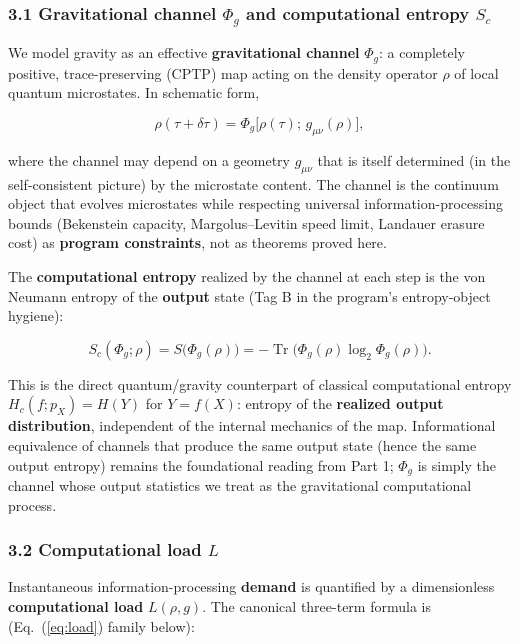 \documentclass[
  11pt,
]{article}
\begin{document}
\subsubsection{\texorpdfstring{3.1 Gravitational channel \(\Phi_g\) and
computational entropy
\(S_c\)}{3.1 Gravitational channel \textbackslash Phi\_g and computational entropy S\_c}}\label{gravitational-channel-phi_g-and-computational-entropy-s_c}

We model gravity as an effective \textbf{gravitational channel}
\(\Phi_g\): a completely positive, trace-preserving (CPTP) map acting on
the density operator \(\rho\) of local quantum microstates. In schematic
form,

\[
\rho(\tau + \delta\tau)
=
\Phi_g\bigl[\rho(\tau);\, g_{\mu\nu}(\rho)\bigr],
\]

where the channel may depend on a geometry \(g_{\mu\nu}\) that is itself
determined (in the self-consistent picture) by the microstate content.
The channel is the continuum object that evolves microstates while
respecting universal information-processing bounds (Bekenstein capacity,
Margolus--Levitin speed limit, Landauer erasure cost) as \textbf{program
constraints}, not as theorems proved here.

The \textbf{computational entropy} realized by the channel at each step
is the von Neumann entropy of the \textbf{output} state (Tag B in the
program's entropy-object hygiene):

\[
S_c(\Phi_g;\rho)
=
S\bigl(\Phi_g(\rho)\bigr)
=
-\operatorname{Tr}\bigl(\Phi_g(\rho)\log_2\Phi_g(\rho)\bigr).
\]

This is the direct quantum/gravity counterpart of classical
computational entropy \(H_c(f;p_X)=H(Y)\) for \(Y=f(X)\): entropy of the
\textbf{realized output distribution}, independent of the internal
mechanics of the map. Informational equivalence of channels that produce the same output state (hence the same output entropy) remains the foundational reading from Part 1;
\(\Phi_g\) is simply the channel whose output statistics we treat as the
gravitational computational process.

\subsubsection{\texorpdfstring{3.2 Computational load
\(L\)}{3.2 Computational load L}}\label{computational-load-l}

Instantaneous information-processing \textbf{demand} is quantified by a
dimensionless \textbf{computational load} \(L(\rho,g)\). The canonical
three-term formula is (Eq.~(\ref{eq:load}) family below):
\end{document}

